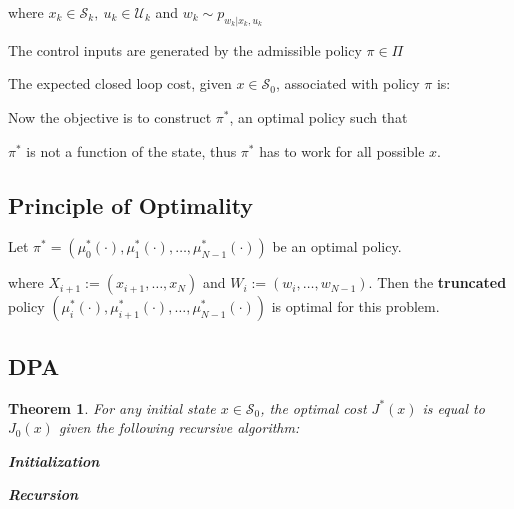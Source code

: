 \documentclass[10pt,a4paper]{scrartcl}
\newtheorem{theorem}{Theorem}
\begin{document}
\begin{multicols*}{2}

where $x_k\in\mathcal{S}_k,\ u_k\in\mathcal{U}_k$ and $w_k\sim p_{w_k|x_k,u_k}$

The control inputs are generated by the admissible policy $\pi\in\Pi$


The expected closed loop cost, given $x\in\mathcal{S}_0$, associated with policy $\pi$ is:


Now the objective is to construct $\pi^\ast$, an optimal policy such that


$\pi^\ast$ is not a function of the state, thus $\pi^\ast$ has to work for all possible $x$.

\subsection{Principle of Optimality}

Let $\pi^\ast=(\mu_0^\ast(\cdot),\mu_1^\ast(\cdot),\ldots,\mu_{N-1}^\ast(\cdot))$ be an optimal policy.


where $X_{i+1}:=(x_{i+1},\ldots,x_N)$ and $W_i:=(w_i,\ldots,w_{N-1})$. Then the \textbf{truncated} policy $(\mu_i^\ast(\cdot),\mu_{i+1}^\ast(\cdot),\ldots,\mu_{N-1}^\ast(\cdot))$ is optimal for this problem.

\subsection{DPA}

\begin{theorem}
For any initial state $x\in\mathcal{S}_0$, the optimal cost $J^\ast(x)$ is equal to $J_0(x)$ given the following recursive algorithm:

\textbf{Initialization}


\textbf{Recursion}



\end{theorem}
\end{multicols*}
\end{document}
